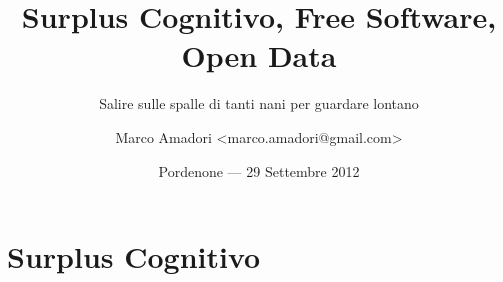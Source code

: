 \documentclass[italian,compress,red]{beamer}
\title[Software e Surplus Cognitivo]{Surplus Cognitivo, Free Software, Open Data}
\subtitle{Salire sulle spalle di tanti nani per guardare lontano}
\author[Marco Amadori]{Marco Amadori <marco.amadori@gmail.com>}
\institute{SpazioDati s.r.l --- \url{http://spaziodati.eu} \\
           Fondazione Bruno Kessler --- \url{http://www.fbk.eu}}
\date{\scriptsize Pordenone --- \vspace{.10cm}29 Settembre 2012}
\begin{document}
\begin{frame}[plain]
  \titlepage
  \begin{center}%
    \end{center}%
\end{frame}







\section{Surplus Cognitivo}
\end{document}
